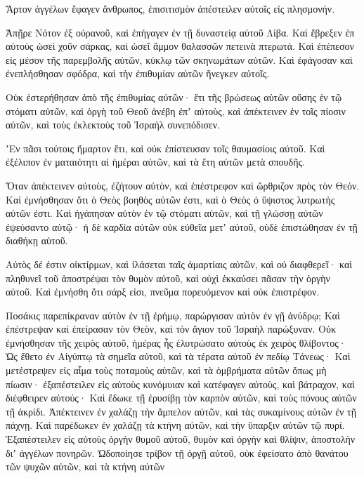 {Ἄρτον ἀγγέλων ἔφαγεν ἄνθρωπος, ἐπισιτισμὸν ἀπέστειλεν αὐτοῖς εἰς πλησμονήν.
\par }{\PP {}Ἀπῇρε Νότον ἐξ οὐρανοῦ, καὶ ἐπήγαγεν ἐν τῇ δυναστείᾳ
αὐτοῦ Λίβα. Καὶ ἔβρεξεν ἐπ αὐτοὺς ὡσεὶ χοῦν σάρκας, καὶ ὡσεῖ ἄμμον θαλασσῶν πετεινὰ πτερωτά.
Καὶ ἐπέπεσον εἰς μέσον τῆς παρεμβολῆς αὐτῶν, κύκλῳ τῶν σκηνωμάτων αὐτῶν.
Καὶ ἐφάγοσαν καὶ ἐνεπλήσθησαν σφόδρα, καὶ τὴν ἐπιθυμίαν αὐτῶν ἤνεγκεν αὐτοῖς.
\par }{\PP {}Οὐκ ἐστερήθησαν ἀπὸ τῆς ἐπιθυμίας αὐτῶν· ἔτι τῆς βρώσεως
αὐτῶν οὔσης ἐν τῷ στόματι αὐτῶν, καὶ ὀργὴ τοῦ Θεοῦ ἀνέβη ἐπʼ αὐτοὺς, καὶ ἀπέκτεινεν ἐν τοῖς πίοσιν αὐτῶν, καὶ τοὺς ἐκλεκτοὺς τοῦ Ἰσραὴλ συνεπόδισεν.
\par }{\PP {}ʼΕν πᾶσι τούτοις ἥμαρτον ἔτι, καὶ οὐκ ἐπίστευσαν τοῖς
θαυμασίοις αὐτοῦ. Καὶ ἐξέλιπον ἐν ματαιότητι αἱ ἡμέραι αὐτῶν, καὶ τὰ ἔτη αὐτῶν μετὰ σπουδῆς.
\par }{\PP {}Ὅταν ἀπέκτεινεν αὐτοὺς, ἐζήτουν αὐτὸν, καὶ ἐπέστρεφον καὶ
ὤρθριζον πρὸς τὸν Θεόν. Καὶ ἐμνήσθησαν ὅτι ὁ Θεὸς βοηθὸς αὐτῶν ἐστι, καὶ ὁ Θεὸς ὁ ὕψιστος λυτρωτὴς αὐτῶν ἐστι.
Καὶ ἠγάπησαν αὐτὸν ἐν τῷ στόματι αὐτῶν, καὶ τῇ γλώσσῃ αὐτῶν
ἐψεύσαντο αὐτῷ· ἡ δὲ καρδία αὐτῶν οὐκ εὐθεῖα μετʼ αὐτοῦ, οὐδὲ ἐπιστώθησαν ἐν τῇ διαθήκῃ αὐτοῦ.
\par }{\PP {}Αὐτὸς δέ ἐστιν οἰκτίρμων, καὶ ἱλάσεται ταῖς ἁμαρτίαις αὐτῶν, καὶ οὐ διαφθερεῖ· καὶ πληθυνεῖ τοῦ ἀποστρέψαι τὸν θυμὸν αὐτοῦ, καὶ οὐχὶ ἐκκαύσει πᾶσαν τὴν ὀργὴν αὐτοῦ.
Καὶ ἐμνήσθη ὅτι σάρξ εἰσι, πνεῦμα πορευόμενον καὶ οὐκ ἐπιστρέφον.
\par }{\PP {}Ποσάκις παρεπίκραναν αὐτὸν ἐν τῇ ἐρήμῳ, παρώργισαν
αὐτὸν ἐν γῇ ἀνύδρῳ; Καὶ ἐπέστρεψαν καὶ ἐπείρασαν τὸν Θεὸν, καὶ τὸν ἅγιον τοῦ Ἰσραὴλ παρώξυναν.
Οὐκ ἐμνήσθησαν τῆς χειρὸς αὐτοῦ, ἡμέρας ἧς ἐλυτρώσατο αὐτοὺς ἐκ χειρὸς θλίβοντος·
Ὡς ἔθετο ἐν Αἰγύπτῳ τὰ σημεῖα αὐτοῦ, καὶ τὰ
τέρατα αὐτοῦ ἐν πεδίῳ Τάνεως· Καὶ μετέστρεψεν εἰς αἷμα τοὺς ποταμοὺς αὐτῶν, καὶ τὰ ὀμβρήματα αὐτῶν ὅπως μὴ πίωσιν·
ἐξαπέστειλεν εἰς αὐτοὺς κυνόμυιαν καὶ κατέφαγεν αὐτοὺς, καὶ βάτραχον, καὶ διέφθειρεν αὐτούς·
Καὶ ἔδωκε τῇ ἐρυσίβῃ τὸν καρπὸν αὐτῶν, καὶ τοὺς πόνους αὐτῶν τῇ ἀκρίδι.
Ἀπέκτεινεν ἐν χαλάζῃ τὴν ἄμπελον αὐτῶν, καὶ τὰς συκαμίνους αὐτῶν ἐν
τῇ πάχνῃ. Καὶ παρέδωκεν ἐν χαλάζῃ τὰ κτήνη αὐτῶν, καὶ τὴν ὕπαρξιν αὐτῶν τῷ πυρί.
Ἐξαπέστειλεν εἰς αὐτοὺς ὀργὴν θυμοῦ αὐτοῦ, θυμὸν καὶ ὀργὴν καὶ θλίψιν, ἀποστολὴν διʼ
ἀγγέλων πονηρῶν. Ὡδοποίησε τρίβον τῇ ὀργῇ αὐτοῦ, οὐκ ἐφείσατο ἀπὸ θανάτου τῶν ψυχῶν αὐτῶν, καὶ τὰ κτήνη αὐτῶν
}
